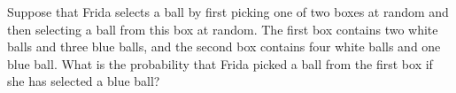 \documentclass[../main.tex]{subfiles}
\begin{document}
Suppose that Frida selects a ball by first picking one of two boxes at random and then selecting a ball from this box at random.
The first box contains two white balls and three blue balls, and the second box contains four white balls and one blue ball.
What is the probability that Frida picked a ball from the first box if she has selected a blue ball?

\solution
\end{document}
